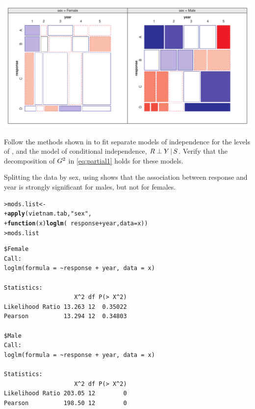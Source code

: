 \documentclass[10pt]{report}\usepackage[]{graphicx}\usepackage[]{color}
\makeatletter
\newcommand{\hlstr}[1]{\textcolor[rgb]{0.192,0.494,0.8}{#1}}%
\newcommand{\hlopt}[1]{\textcolor[rgb]{0,0,0}{#1}}%
\newcommand{\hlstd}[1]{\textcolor[rgb]{0.345,0.345,0.345}{#1}}%
\newcommand{\hlkwa}[1]{\textcolor[rgb]{0.161,0.373,0.58}{\textbf{#1}}}%
\newcommand{\hlkwb}[1]{\textcolor[rgb]{0.69,0.353,0.396}{#1}}%
\newcommand{\hlkwc}[1]{\textcolor[rgb]{0.333,0.667,0.333}{#1}}%
\newcommand{\hlkwd}[1]{\textcolor[rgb]{0.737,0.353,0.396}{\textbf{#1}}}%
\newenvironment{kframe}{%
 \def\at@end@of@kframe{}%
 \ifinner\ifhmode%
  \def\at@end@of@kframe{\end{minipage}}%
  \begin{minipage}{\columnwidth}%
 \fi\fi%
 \def\FrameCommand##1{\hskip\@totalleftmargin \hskip-\fboxsep
 \colorbox{shadecolor}{##1}\hskip-\fboxsep
     \hskip-\linewidth \hskip-\@totalleftmargin \hskip\columnwidth}%
 \MakeFramed {\advance\hsize-\width
   \@totalleftmargin\z@ \linewidth\hsize
   \@setminipage}}%
 {\par\unskip\endMakeFramed%
 \at@end@of@kframe}
\newenvironment{knitrout}{}{} %
\renewenvironment{knitrout}{\small\renewcommand{\baselinestretch}{.85}}{} %
\makeatother
\begin{document}
\begin{Exercises}
\begin{enumerate*}
\begin{ans}
\begin{knitrout}
\centerline{\includegraphics[width=.8\textwidth]{soln/fig/ex5_10b-1} }



\end{knitrout}

      \end{ans}
      
      \item Follow the methods shown in  to fit separate models of independence for the levels of ,
      and the model of conditional independence, $R \perp Y \, | \, S$.
      Verify that the decomposition of $G^2$ in \eqref{eq:partial1} holds for these models.
      \begin{ans}
      Splitting the data by sex, using  shows that the association between response and year is
      strongly significant for males, but not for females. 
\begin{knitrout}\footnotesize
{}\color{fgcolor}\begin{kframe}
\begin{alltt}
\hlstd{> }\hlstd{mods.list} \hlkwb{<-}
\hlstd{+ }        \hlkwd{apply}\hlstd{(vietnam.tab,} \hlstr{"sex"}\hlstd{,}
\hlstd{+ }              \hlkwa{function}\hlstd{(}\hlkwc{x}\hlstd{)} \hlkwd{loglm}\hlstd{(}\hlopt{~} \hlstd{response} \hlopt{+} \hlstd{year,} \hlkwc{data}\hlstd{=x))}
\hlstd{> }\hlstd{mods.list}
\end{alltt}
\begin{verbatim}
$Female
Call:
loglm(formula = ~response + year, data = x)

Statistics:
                    X^2 df P(> X^2)
Likelihood Ratio 13.263 12  0.35022
Pearson          13.294 12  0.34803

$Male
Call:
loglm(formula = ~response + year, data = x)

Statistics:
                    X^2 df P(> X^2)
Likelihood Ratio 203.05 12        0
Pearson          198.50 12        0
\end{verbatim}
\end{kframe}
\end{knitrout}
      \end{ans}
      

\end{enumerate*}
\end{Exercises}
\end{document}
